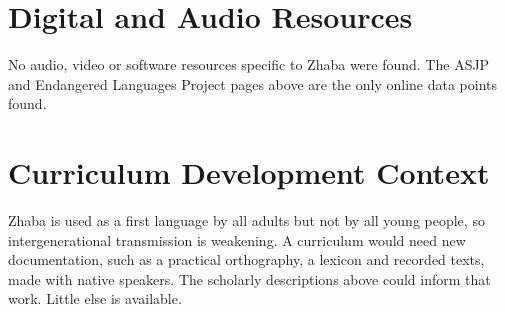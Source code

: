\documentclass[12pt]{article}
\begin{document}
\section{Digital and Audio Resources}
No audio, video or software resources specific to Zhaba were found. The ASJP and Endangered Languages Project pages above are the only online data points found.

\section{Curriculum Development Context}
Zhaba is used as a first language by all adults but not by all young people, so intergenerational transmission is weakening. A curriculum would need new documentation, such as a practical orthography, a lexicon and recorded texts, made with native speakers. The scholarly descriptions above could inform that work. Little else is available.
\end{document}
